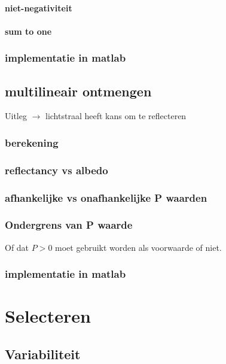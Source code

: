 \documentclass[12pt]{report}
\begin{document}
\subsubsection{niet-negativiteit}

\subsubsection{sum to one}



\subsection{implementatie in matlab}

\section{multilineair ontmengen}

Uitleg $\rightarrow$ lichtstraal heeft kans om te reflecteren

\subsection{berekening}

\subsection{reflectancy vs albedo}

\subsection{afhankelijke vs onafhankelijke P waarden}

\subsection{Ondergrens van P waarde}

Of dat $P > 0$ moet gebruikt worden als voorwaarde of niet.

\subsection{implementatie in matlab}

\chapter{Selecteren}

\section{Variabiliteit}
\end{document}
